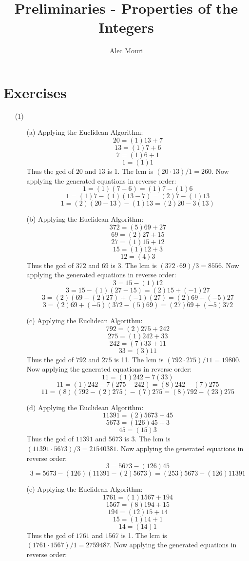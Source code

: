 \documentclass[12pt]{article}
\begin{document}
\title{Preliminaries - Properties of the Integers}
\author{Alec Mouri}

\maketitle
\section*{Exercises}
\begin{itemize}
\item[(1)]
\begin{itemize}
\item[(a)]Applying the Euclidean Algorithm:
$$20 = (1)13 + 7$$
$$13 = (1)7 + 6$$
$$7 = (1)6 + 1$$
$$1 = (1)1$$
Thus the gcd of $20$ and $13$ is 1. The lcm is $(20 \cdot 13) / 1 = 260$. Now applying the generated equations in reverse order:
$$1 = (1)(7 - 6) = (1)7 - (1)6$$
$$1 = (1)7 - (1)(13 - 7) = (2)7 - (1)13$$
$$1 = (2)(20 - 13) - (1)13 = (2)20 - 3(13)$$
\item[(b)] Applying the Euclidean Algorithm:
$$372 = (5)69 + 27$$
$$69 = (2)27 + 15$$
$$27 = (1)15 + 12$$
$$15 = (1)12 + 3$$
$$12 = (4)3$$
Thus the gcd of $372$ and $69$ is 3. The lcm is $(372 \cdot 69) / 3 = 8556$. Now applying the generated equations in reverse order:
$$3 = 15 - (1)12$$
$$3 = 15 - (1)(27 - 15) = (2)15 + (-1)27$$
$$3 = (2)(69 - (2)27) + (-1)(27) = (2)69 + (-5)27$$
$$3 = (2)69 + (-5)(372 - (5)69) = (27)69 + (-5)372$$
\item[(c)] Applying the Euclidean Algorithm:
$$792 = (2)275 + 242$$
$$275 = (1)242 + 33$$
$$242 = (7)33 + 11$$
$$33 = (3)11$$
Thus the gcd of $792$ and $275$ is 11. The lcm is $(792 \cdot 275) / 11 = 19800$. Now applying the generated equations in reverse order:
$$11 = (1)242 - 7(33)$$
$$11 = (1)242 - 7(275 - 242) = (8)242 - (7)275$$
$$11 = (8)(792 - (2)275) - (7)275 = (8)792 - (23)275$$
\item[(d)] Applying the Euclidean Algorithm:
$$11391 = (2)5673 + 45$$
$$5673 = (126)45 + 3$$
$$45 = (15)3$$
Thus the gcd of $11391$ and $5673$ is 3. The lcm is $(11391 \cdot 5673) / 3 = 21540381$. Now applying the generated equations in reverse order:
$$3 = 5673 - (126)45$$
$$3 = 5673 - (126)(11391 - (2)5673) = (253)5673 - (126)11391$$
\item[(e)] Applying the Euclidean Algorithm:
$$1761 = (1)1567 + 194$$
$$1567 = (8)194 + 15$$
$$194 = (12)15 + 14$$
$$15 = (1)14 + 1$$
$$14 = (14)1$$
Thus the gcd of $1761$ and $1567$ is 1. The lcm is $(1761 \cdot 1567) / 1 = 2759487$. Now applying the generated equations in reverse order:

\end{itemize}
\end{itemize}
\end{document}
